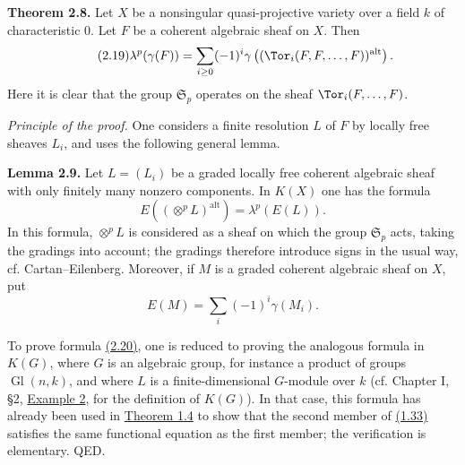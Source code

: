 \textbf{Theorem 2.8.} Let $X$ be a nonsingular quasi-projective variety over a field $k$ of characteristic $0$. Let $F$ be a coherent algebraic sheaf on $X$. Then
\begin{equation}\tag{2.19}
 \lambda^p(\gamma(F))=\sum_{i\geq 0}(-1)^i\gamma\left((\Tor_i(F,F,\ldots,F))^{\mathrm{alt}}\right).
\end{equation}
Here it is clear that the group $\mathfrak S_p$ operates on the sheaf $\Tor_i(F,\ldots,F)$.

\emph{Principle of the proof.} One considers a finite resolution $L$ of $F$ by locally free sheaves $L_i$, and uses the following general lemma.

\textbf{Lemma 2.9.} Let $L=(L_i)$ be a graded locally free coherent algebraic sheaf with only finitely many nonzero components. In $K(X)$ one has the formula
\begin{equation}\tag{2.20}
 E\left((\otimes^p L)^{\mathrm{alt}}\right)=\lambda^p(E(L)).
\end{equation}
In this formula, $\otimes^pL$ is considered as a sheaf on which the group $\mathfrak S_p$ acts, taking the gradings into account; the gradings therefore introduce signs in the usual way, cf. Cartan--Eilenberg. Moreover, if $M$ is a graded coherent algebraic sheaf on $X$, put
\[
 E(M)=\sum_i(-1)^i\gamma(M_i).
\]

To prove formula \hyperlink{sga6.e00.eq.2-20}{(2.20)}, one is reduced to proving the analogous formula in $K(G)$, where $G$ is an algebraic group, for instance a product of groups $\operatorname{Gl}(n,k)$, and where $L$ is a finite-dimensional $G$-module over $k$ (cf. Chapter I, \S 2, \hyperlink{sga6.e00.ex.2-2}{Example 2}, for the definition of $K(G)$). In that case, this formula has already been used in \hyperlink{sga6.e00.thm.1-4}{Theorem 1.4} to show that the second member of \hyperlink{sga6.e00.eq.1-33}{(1.33)} satisfies the same functional equation as the first member; the verification is elementary. QED.

